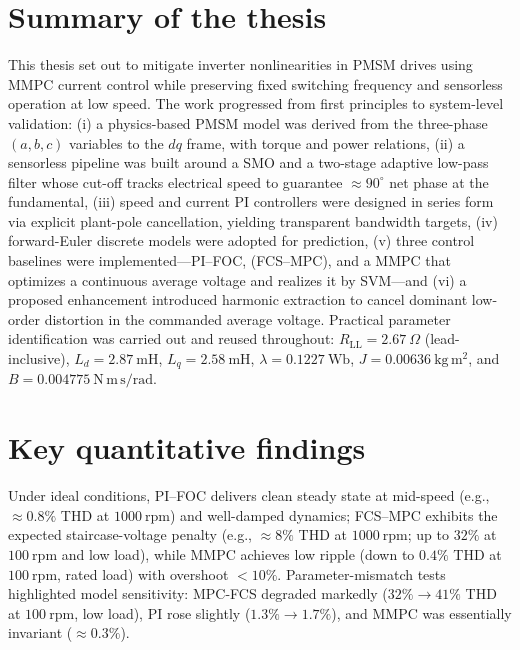 \let\cleardoublepage\clearpage
\label{ch:conclusion}

\section*{Summary of the thesis}
This thesis set out to mitigate inverter non\-linearities in PMSM drives using MMPC current control while preserving fixed switching frequency and sensorless operation at low speed. The work progressed from first principles to system-level validation: (i) a physics-based PMSM model was derived from the three-phase $(a,b,c)$ variables to the $dq$ frame, with torque and power relations, (ii) a sensorless pipeline was built around a SMO and a two-stage adaptive low-pass filter whose cut-off tracks electrical speed to guarantee $\approx90^\circ$ net phase at the fundamental, (iii) speed and current PI controllers were designed in series form via explicit plant-pole cancellation, yielding transparent bandwidth targets, (iv) forward-Euler discrete models were adopted for prediction, (v) three control baselines were implemented—PI–FOC, (FCS–MPC), and a MMPC that optimizes a continuous average voltage and realizes it by SVM—and (vi) a proposed enhancement introduced harmonic extraction to cancel dominant low-order distortion in the commanded average voltage. Practical parameter identification was carried out and reused throughout: $R_{\mathrm{LL}}=2.67~\Omega$ (lead-inclusive), $L_d=2.87~\mathrm{mH}$, $L_q=2.58~\mathrm{mH}$, $\lambda=0.1227~\mathrm{Wb}$, $J=0.00636~\mathrm{kg\,m^2}$, and $B=0.004775~\mathrm{N\,m\,s/rad}$.

\section*{Key quantitative findings}
Under ideal conditions, PI–FOC delivers clean steady state at mid-speed (e.g., $\approx0.8\%$ THD at $1000~\mathrm{rpm}$) and well-damped dynamics; FCS–MPC exhibits the expected staircase-voltage penalty (e.g., $\approx8\%$ THD at $1000~\mathrm{rpm}$; up to $32\%$ at $100~\mathrm{rpm}$ and low load), while MMPC achieves low ripple (down to $0.4\%$ THD at $100~\mathrm{rpm}$, rated load) with overshoot $<10\%$. Parameter-mismatch tests highlighted model sensitivity: MPC-FCS degraded markedly ($32\%\!\to\!41\%$ THD at $100~\mathrm{rpm}$, low load), PI rose slightly ($1.3\%\!\to\!1.7\%$), and MMPC was essentially invariant ($\approx0.3\%$).

